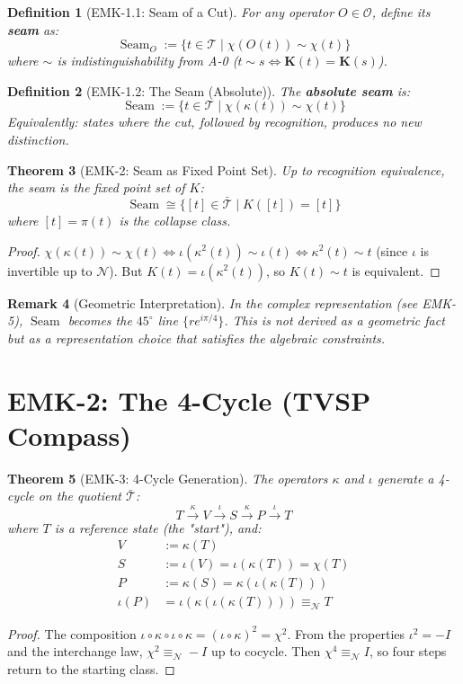\documentclass[12pt, oneside]{article}
\newtheorem{theorem}{Theorem}[section]
\newtheorem{definition}[theorem]{Definition}
\newtheorem{remark}[theorem]{Remark}
\newcommand{\K}{\mathbf{K}}
\newcommand{\N}{\mathcal{N}}
\newcommand{\T}{\mathcal{T}}
\newcommand{\Opr}{\mathcal{O}}
\newcommand{\Seam}{\mathop{\mathrm{Seam}}}
\begin{document}
\begin{definition}[EMK-1.1: Seam of a Cut]
For any operator $O \in \Opr$, define its \textbf{seam} as:
\[
\Seam_O := \{ t \in \T \mid \chi(O(t)) \sim \chi(t) \}
\]
where $\sim$ is indistinguishability from A-0 ($t \sim s \iff \K(t) = \K(s)$).
\end{definition}

\begin{definition}[EMK-1.2: The Seam (Absolute)]
The \textbf{absolute seam} is:
\[
\boxed{\Seam := \{ t \in \T \mid \chi(\kappa(t)) \sim \chi(t) \}}
\]
Equivalently: states where the cut, followed by recognition, produces no new distinction.
\end{definition}

\begin{theorem}[EMK-2: Seam as Fixed Point Set]
Up to recognition equivalence, the seam is the fixed point set of $K$:
\[
\Seam \cong \{ [t] \in \bar{\T} \mid K([t]) = [t] \}
\]
where $[t] = \pi(t)$ is the collapse class.
\end{theorem}
\begin{proof}
$\chi(\kappa(t)) \sim \chi(t) \iff \iota(\kappa^2(t)) \sim \iota(t) \iff \kappa^2(t) \sim t$ (since $\iota$ is invertible up to $\N$). But $K(t) = \iota(\kappa^2(t))$, so $K(t) \sim t$ is equivalent.
\end{proof}

\begin{remark}[Geometric Interpretation]
In the complex representation (see EMK-5), $\Seam$ becomes the $45^\circ$ line $\{re^{i\pi/4}\}$. This is not derived as a geometric fact but as a representation choice that satisfies the algebraic constraints.
\end{remark}

\section{EMK-2: The 4-Cycle (TVSP Compass)}

\begin{theorem}[EMK-3: 4-Cycle Generation]
The operators $\kappa$ and $\iota$ generate a 4-cycle on the quotient $\bar{\T}$:
\[
T \xrightarrow{\kappa} V \xrightarrow{\iota} S \xrightarrow{\kappa} P \xrightarrow{\iota} T
\]
where $T$ is a reference state (the "start"), and:
\begin{align*}
V &:= \kappa(T) \\
S &:= \iota(V) = \iota(\kappa(T)) = \chi(T) \\
P &:= \kappa(S) = \kappa(\iota(\kappa(T))) \\
\iota(P) &= \iota(\kappa(\iota(\kappa(T)))) \equiv_\N T
\end{align*}
\end{theorem}
\begin{proof}
The composition $\iota \circ \kappa \circ \iota \circ \kappa = (\iota \circ \kappa)^2 = \chi^2$. From the properties $\iota^2 = -I$ and the interchange law, $\chi^2 \equiv_\N -I$ up to cocycle. Then $\chi^4 \equiv_\N I$, so four steps return to the starting class.
\end{proof}
\end{document}

